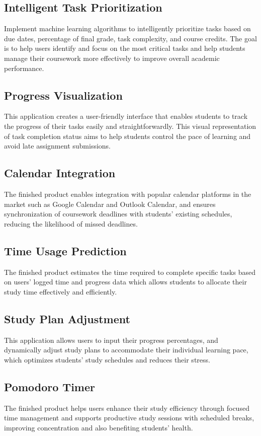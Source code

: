 \documentclass{article}
\begin{document}
    \subsection{Intelligent Task Prioritization}

    Implement machine learning algorithms to intelligently prioritize tasks based on due dates, percentage of final grade, task complexity, and course credits. The goal is to help users identify and focus on the most critical tasks and help students manage their coursework more effectively to improve overall academic performance.
    
    \subsection{Progress Visualization}
    This application creates a user-friendly interface that enables students to track the progress of their tasks easily and straightforwardly. This visual representation of task completion status aims to help students control the pace of learning and avoid late assignment submissions.
 
    \subsection{Calendar Integration}
    The finished product enables integration with popular calendar platforms in the market such as Google Calendar and Outlook Calendar, and ensures synchronization of coursework deadlines with students' existing schedules, reducing the likelihood of missed deadlines.
    
    \subsection{Time Usage Prediction}
    The finished product estimates the time required to complete specific tasks based on users' logged time and progress data which allows students to allocate their study time effectively and efficiently.

 
    \subsection{Study Plan Adjustment}
    This application allows users to input their progress percentages, and dynamically adjust study plans to accommodate their individual learning pace, which optimizes students' study schedules and reduces their stress.


    \subsection{Pomodoro Timer}
    The finished product helps users enhance their study efficiency through focused time management and supports productive study sessions with scheduled breaks, improving concentration and also benefiting students' health.
\end{document}
